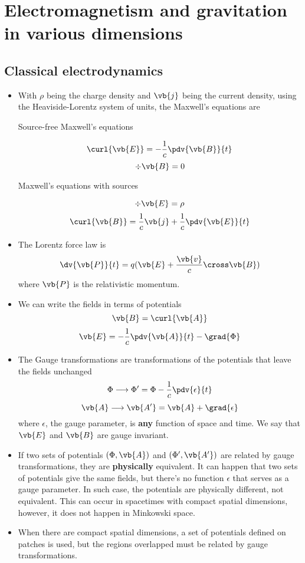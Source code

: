 \documentclass[12pt]{report}
\begin{document}
\chapter{Electromagnetism and gravitation in various dimensions}
\newpage
\section{Classical electrodynamics}
\begin{itemize}
    \item With $\rho$ being the charge density and $\vb{j}$ being the current density, using the Heaviside-Lorentz system of units, the Maxwell's equations are
    \begin{center}
    Source-free Maxwell's equations
    \end{center}
    $$\curl{\vb{E}} = -\frac{1}{c}\pdv{\vb{B}}{t}$$
    $$\div{\vb{B}} = 0 $$
    \begin{center}
    Maxwell's equations with sources
    \end{center}
    $$\div{\vb{E}} = \rho$$
    $$\curl{\vb{B}} = \frac{1}{c}\vb{j} + \frac{1}{c}\pdv{\vb{E}}{t}$$
    \item The Lorentz force law is
    $$\dv{\vb{P}}{t} = q(\vb{E} + \frac{\vb{v}}{c}\cross \vb{B})$$
    where $\vb{P}$ is the relativistic momentum.
    \item We can write the fields in terms of potentials
    $$\vb{B} = \curl{\vb{A}}$$
    $$\vb{E} = -\frac{1}{c}\pdv{\vb{A}}{t} - \grad{\Phi}$$
    \item  The Gauge transformations are transformations of the potentials that leave the fields unchanged
    $$\Phi \longrightarrow \Phi ' = \Phi - \frac{1}{c}\pdv{\epsilon}{t}$$
    $$\vb{A} \longrightarrow \vb{A'} = \vb{A} + \grad{\epsilon}$$
    where $\epsilon$, the gauge parameter, is \textbf{any} function of space and time. We say that $\vb{E}$ and $\vb{B}$ are gauge invariant.
    \item If two sets of potentials $(\Phi, \vb{A})$ and $(\Phi ', \vb{A'})$ are related by gauge transformations, they are \textbf{physically} equivalent. It can happen that two sets of potentials give the same fields, but there's no function $\epsilon$ that serves as a gauge parameter. In such case, the potentials are physically different, not equivalent. This can occur in spacetimes with compact spatial dimensions, however, it does not happen in Minkowski space.
    \item When there are compact spatial dimensions, a set of potentials defined on patches is used, but the regions overlapped must be related by gauge transformations.
\end{itemize}
\end{document}
